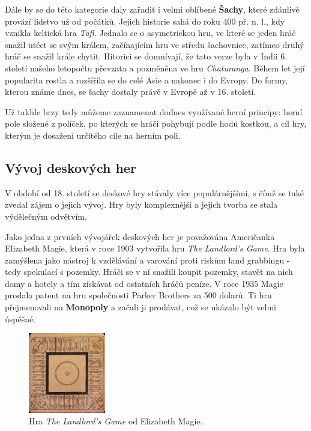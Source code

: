 Dále by se do této kategorie daly zařadit i velmi oblíbené \textbf{Šachy}, které zdánlivě provází lidstvo už od počátků. Jejich historie sahá do roku 400 př. n. l., kdy vznikla keltická hra \textit{Tafl}. Jednalo se o asymetrickou hru, ve které se jeden hráč snažil utéct se svým králem, začínajícím hru ve středu šachovnice, zatímco druhý hráč se snažil krále chytit. Hitorici se domnívají, že tato verze byla v Indii 6. století našeho letopočtu převzata a pozměněna ve hru \textit{Chaturanga}. Během let její popularita rostla a rozšířila se do celé Asie a nakonec i do Evropy. Do formy, kterou známe dnes, se šachy dostaly právě v Evropě až v 16. století. \cite{chess_com_2023}

Už takhle brzy tedy můžeme zaznamenat dodnes využívané herní principy: herní pole složené z políček, po kterých se hráči pohybují podle hodů kostkou, a cíl hry, kterým je dosažení určitého cíle na herním poli. \cite{attia_2018}

\subsection{Vývoj deskových her}
\label{subsec:development}

V období od 18. století se deskové hry stávaly více populárnějšími, s čímž se také zvedal zájem o jejich vývoj. Hry byly komplexnější a jejich tvorba se stala výdělečným odvětvím.

Jako jedna z prvních vývojářek deskových her je považována Američanka Elizabeth Magie, která v roce 1903 vytvořila hru \textit{The Landlord's Game}. Hra byla zamýšlena jako nástroj k vzdělávání a varování proti riskům land grabbingu - tedy spekulací s pozemky. Hráči se v ní snažili koupit pozemky, stavět na nich domy a hotely a tím získávat od ostatních hráčů peníze. V roce 1935 Magie prodala patent na hru společnosti Parker Brothers za 500 dolarů. Ti hru přejmenovali na \textbf{Monopoly} a začali ji prodávat, což se ukázalo být velmi úspěšné. \cite{attia_2018}

\begin{figure}[H]
    \centering
    \includegraphics[width=0.3\textwidth]{Figures/Theory/landlords-game.png}
    \caption{Hra \textit{The Landlord's Game} od Elizabeth Magie. \cite{attia_2018}}
    \label{fig:landlords-game}
\end{figure}

